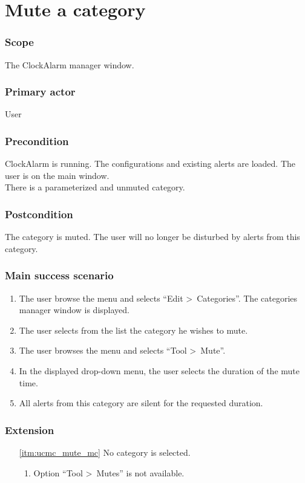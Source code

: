 \section{Mute a category}\label{subsec:usecase_mute_category}

\subsubsection{Scope}
The ClockAlarm manager window.
\subsubsection{Primary actor}
User
\subsubsection{Precondition}
ClockAlarm is running. The configurations and existing alerts are loaded. The user is on the main window.
\\There is a parameterized and unmuted category.
\subsubsection{Postcondition}
The category is muted. The user will no longer be disturbed by alerts from this category.
\subsubsection{Main success scenario}
\begin{enumerate}
	\item The user browse the menu and selects ``Edit \textgreater~Categories''. The categories manager window is displayed. 
	\item The user selects from the list the category he wishes to mute.
	\item \label{itm:ucmc_mute_mc}The user browses the menu and selects ``Tool \textgreater~Mute''.
	\item In the displayed drop-down menu, the user selects the duration of the mute time.
	\item All alerts from this category are silent for the requested duration.
\end{enumerate}
\subsubsection{Extension}
\begin{enumerate}
	\item[\ref{itm:ucmc_mute_mc}] No category is selected.
	\begin{enumerate}[i]
		\item Option ``Tool \textgreater~Mutes'' is not available.
	\end{enumerate}
\end{enumerate}

